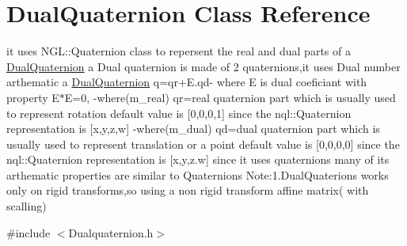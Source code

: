 \hypertarget{class_dual_quaternion}{\section{Dual\-Quaternion Class Reference}
\label{class_dual_quaternion}
}


it uses N\-G\-L\-::\-Quaternion class to repersent the real and dual parts of a \hyperlink{class_dual_quaternion}{Dual\-Quaternion} a Dual quaternion is made of 2 quaternions,it uses Dual number arthematic a \hyperlink{class_dual_quaternion}{Dual\-Quaternion} q=qr+\-E.qd-\/ where E is dual coeficiant with property E$\ast$\-E=0, -\/where(m\-\_\-real) qr=real quaternion part which is usually used to represent rotation default value is \mbox{[}0,0,0,1\mbox{]} since the nql\-::\-Quaternion representation is \mbox{[}x,y,z,w\mbox{]} -\/where(m\-\_\-dual) qd=dual quaternion part which is usually used to represent translation or a point default value is \mbox{[}0,0,0,0\mbox{]} since the nql\-::\-Quaternion representation is \mbox{[}x,y,z.\-w\mbox{]} since it uses quaternions many of its arthematic properties are similar to Quaternions Note\-:1.\-Dual\-Quaterions works only on rigid transforms,so using a non rigid transform affine matrix( with scalling)  




{\ttfamily \#include $<$Dualquaternion.\-h$>$}

